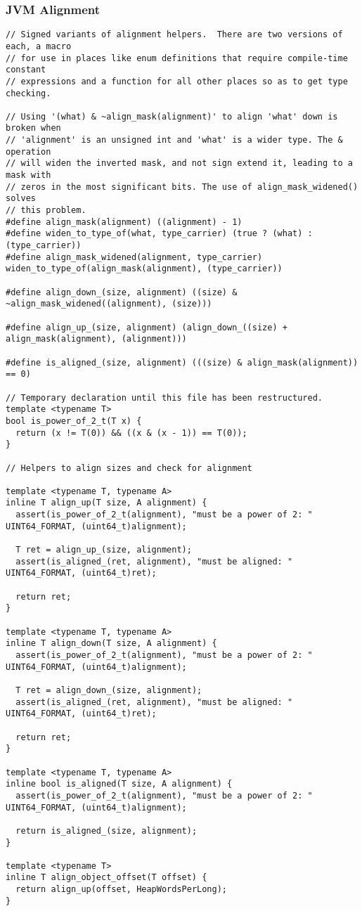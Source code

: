 \subsubsection{JVM Alignment}

\begin{verbatim}
// Signed variants of alignment helpers.  There are two versions of each, a macro
// for use in places like enum definitions that require compile-time constant
// expressions and a function for all other places so as to get type checking.

// Using '(what) & ~align_mask(alignment)' to align 'what' down is broken when
// 'alignment' is an unsigned int and 'what' is a wider type. The & operation
// will widen the inverted mask, and not sign extend it, leading to a mask with
// zeros in the most significant bits. The use of align_mask_widened() solves
// this problem.
#define align_mask(alignment) ((alignment) - 1)
#define widen_to_type_of(what, type_carrier) (true ? (what) : (type_carrier))
#define align_mask_widened(alignment, type_carrier) widen_to_type_of(align_mask(alignment), (type_carrier))

#define align_down_(size, alignment) ((size) & ~align_mask_widened((alignment), (size)))

#define align_up_(size, alignment) (align_down_((size) + align_mask(alignment), (alignment)))

#define is_aligned_(size, alignment) (((size) & align_mask(alignment)) == 0)

// Temporary declaration until this file has been restructured.
template <typename T>
bool is_power_of_2_t(T x) {
  return (x != T(0)) && ((x & (x - 1)) == T(0));
}

// Helpers to align sizes and check for alignment

template <typename T, typename A>
inline T align_up(T size, A alignment) {
  assert(is_power_of_2_t(alignment), "must be a power of 2: " UINT64_FORMAT, (uint64_t)alignment);

  T ret = align_up_(size, alignment);
  assert(is_aligned_(ret, alignment), "must be aligned: " UINT64_FORMAT, (uint64_t)ret);

  return ret;
}

template <typename T, typename A>
inline T align_down(T size, A alignment) {
  assert(is_power_of_2_t(alignment), "must be a power of 2: " UINT64_FORMAT, (uint64_t)alignment);

  T ret = align_down_(size, alignment);
  assert(is_aligned_(ret, alignment), "must be aligned: " UINT64_FORMAT, (uint64_t)ret);

  return ret;
}

template <typename T, typename A>
inline bool is_aligned(T size, A alignment) {
  assert(is_power_of_2_t(alignment), "must be a power of 2: " UINT64_FORMAT, (uint64_t)alignment);

  return is_aligned_(size, alignment);
}
    
template <typename T>
inline T align_object_offset(T offset) {
  return align_up(offset, HeapWordsPerLong);
}
\end{verbatim}


  
